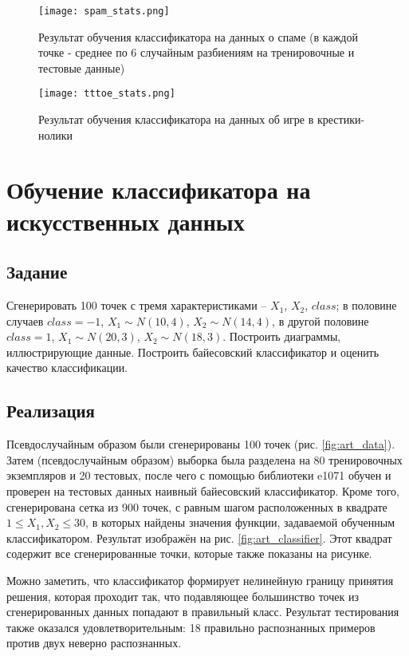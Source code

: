 \documentclass[a4paper,12pt]{article} %
\newcommand{\myPictWidth}{.95\textwidth}
\begin{document}
\begin{figure}[H]
	\centering \texttt{[image: spam\_stats.png]}
	\caption{Результат обучения классификатора на данных о спаме (в каждой точке - среднее по 6 случайным разбиениям на тренировочные и тестовые данные)}
	\label{fig:spam}
\end{figure}

\begin{figure}[H]
	\centering \texttt{[image: tttoe\_stats.png]}
	\caption{Результат обучения классификатора на данных об игре в крестики-нолики}
	\label{fig:ttoe}
\end{figure}

\section{Обучение классификатора на искусственных данных}
\subsection{Задание}
Сгенерировать 100 точек с тремя характеристиками -- $X_1$, $X_2$, $class$; в половине случаев $class=-1$, $X_1 \sim N(10,4)$, $X_2 \sim N(14,4)$, в другой половине $class=1$, $X_1 \sim N(20,3)$, $X_2 \sim N(18,3)$.
Построить диаграммы, иллюстрирующие данные. Построить байесовский классификатор и оценить качество классификации.

\subsection{Реализация}

Псевдослучайным образом были сгенерированы 100 точек (рис. \ref{fig:art_data}). Затем (псевдослучайным образом) выборка была разделена на 80 тренировочных экземпляров и 20 тестовых, после чего с помощью библиотеки e1071 обучен и проверен на тестовых данных наивный байесовский классификатор. Кроме того, сгенерирована сетка из 900 точек, с равным шагом расположенных в квадрате $1 \le X_1, X_2 \le 30$, в которых найдены значения функции, задаваемой обученным классификатором. Результат изображён на рис. \ref{fig:art_classifier}. Этот квадрат содержит все сгенерированные точки, которые также показаны на рисунке.

Можно заметить, что классификатор формирует нелинейную границу принятия решения, которая проходит так, что подавляющее большинство точек из сгенерированных данных попадают в правильный класс. Результат тестирования также оказался удовлетворительным: 18 правильно распознанных примеров против двух неверно распознанных.
\end{document}
